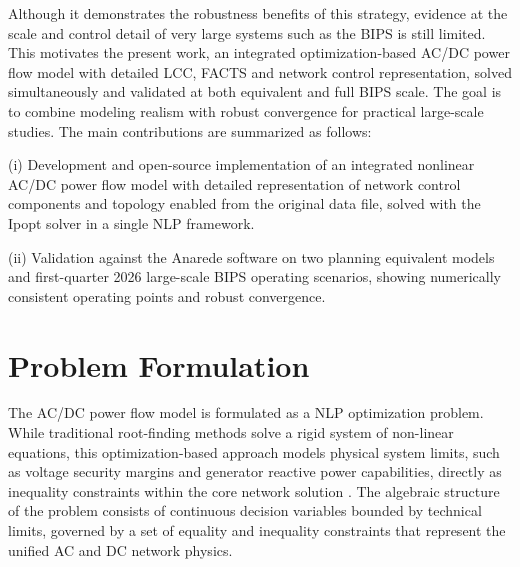 \documentclass[letterpaper,journal]{IEEEtran}
\begin{document}
Although it demonstrates the robustness benefits of this strategy, evidence at the scale and control detail of very large
systems such as the BIPS is still limited. This motivates the present work, an integrated optimization-based AC/DC power flow model with detailed
LCC, FACTS and network control representation, solved simultaneously and validated at both equivalent and full BIPS scale. The goal
is to combine modeling realism with robust convergence for practical large-scale studies. The main contributions are summarized as follows:

(i) Development and open-source implementation of an integrated nonlinear AC/DC power flow model  with detailed representation
 of network control components and topology enabled from the original data file, solved with the Ipopt solver \cite{ref8} in a single NLP framework. 

(ii) Validation against the Anarede software \cite{ref9} on two planning equivalent models and first-quarter 2026 large-scale BIPS
operating scenarios, showing numerically consistent operating points and robust convergence.
\section{Problem Formulation}
	The AC/DC power flow model is formulated as a NLP optimization problem. While traditional root-finding methods solve a rigid system of
	non-linear equations, this optimization-based approach models physical system limits, such as voltage security margins and generator
reactive power capabilities, directly as inequality constraints within the core network solution \cite{ref10}. The algebraic structure
of the problem consists of continuous decision variables bounded by technical limits, governed by a set of equality and inequality
constraints that represent the unified AC and DC network physics.
\end{document}
